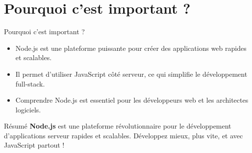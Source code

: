 \documentclass{clbeamer2024}
\begin{document}
	\section{Pourquoi c'est important ?}
	\begin{frame}{Pourquoi c'est important ?}
		\begin{itemize}
			\item Node.js est une plateforme puissante pour créer des applications web rapides et scalables.
			\item Il permet d'utiliser JavaScript côté serveur, ce qui simplifie le développement full-stack.
			\item Comprendre Node.js est essentiel pour les développeurs web et les architectes logiciels.
		\end{itemize}
	\end{frame}
	
	
	\begin{frame}{Résumé}
		\textbf{Node.js} est une plateforme révolutionnaire pour le développement d'applications serveur rapides et scalables.  
		Développez mieux, plus vite, et avec JavaScript partout !
	\end{frame}
	
	
	
	
	
	
	
\end{document}
